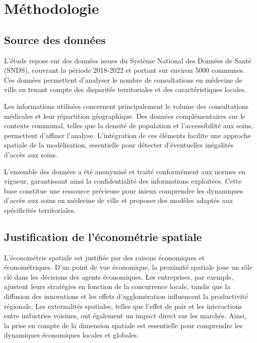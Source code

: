 \documentclass[
]{article}
\author{}
\date{\vspace{-2.5em}}
\begin{document}
\section{Méthodologie}\label{muxe9thodologie}

\subsection{Source des données}\label{source-des-donnuxe9es}

L'étude repose sur des données issues du Système National des Données de
Santé (SNDS), couvrant la période 2018-2022 et portant sur environ 5000
communes. Ces données permettent d'analyser le nombre de consultations
en médecine de ville en tenant compte des disparités territoriales et
des caractéristiques locales.

Les informations utilisées concernent principalement le volume des
consultations médicales et leur répartition géographique. Des données
complémentaires sur le contexte communal, telles que la densité de
population et l'accessibilité aux soins, permettent d'affiner l'analyse.
L'intégration de ces éléments facilite une approche spatiale de la
modélisation, essentielle pour détecter d'éventuelles inégalités d'accès
aux soins.

L'ensemble des données a été anonymisé et traité conformément aux normes
en vigueur, garantissant ainsi la confidentialité des informations
exploitées. Cette base constitue une ressource précieuse pour mieux
comprendre les dynamiques d'accès aux soins en médecine de ville et
proposer des modèles adaptés aux spécificités territoriales.

\subsection{Justification de l'économétrie
spatiale}\label{justification-de-luxe9conomuxe9trie-spatiale}

L'économétrie spatiale est justifiée par des raisons économiques et
économétriques. D'un point de vue économique, la proximité spatiale joue
un rôle clé dans les décisions des agents économiques. Les entreprises,
par exemple, ajustent leurs stratégies en fonction de la concurrence
locale, tandis que la diffusion des innovations et les effets
d'agglomération influencent la productivité régionale. Les externalités
spatiales, telles que l'effet de pair et les interactions entre
industries voisines, ont également un impact direct sur les marchés.
Ainsi, la prise en compte de la dimension spatiale est essentielle pour
comprendre les dynamiques économiques locales et globales.
\end{document}
